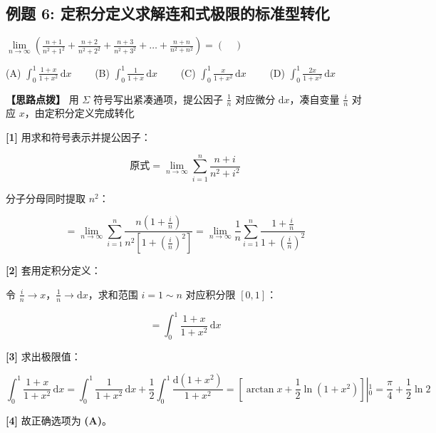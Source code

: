 \documentclass[11pt,a4paper,UTF8]{ctexart}
\begin{document}
\subsection{例题 6: 定积分定义求解连和式极限的标准型转化}

$\lim\limits_{n \to \infty} \left( \frac{n+1}{n^2+1^2} + \frac{n+2}{n^2+2^2} + \frac{n+3}{n^2+3^2} + \dots + \frac{n+n}{n^2+n^2} \right) = (\quad)$

(A) $\int_0^1 \frac{1+x}{1+x^2}\,\mathrm{d}x \qquad$ (B) $\int_0^1 \frac{1}{1+x}\,\mathrm{d}x \qquad$ (C) $\int_0^1 \frac{x}{1+x^2}\,\mathrm{d}x \qquad$ (D) $\int_0^1 \frac{2x}{1+x^2}\,\mathrm{d}x$

\textbf{\color{DeepPurple}【思路点拨】} 用 $\Sigma$ 符号写出紧凑通项，提公因子 $\frac{1}{n}$ 对应微分 $\mathrm{d}x$，凑自变量 $\frac{i}{n}$ 对应 $x$，由定积分定义完成转化


\begin{solbox}[分步推导与答题规范]
\textbf{[1]} 用求和符号表示并提公因子：


\begin{equation*}
\text{原式} = \lim_{n \to \infty} \sum_{i=1}^n \frac{n+i}{n^2+i^2}
\end{equation*}


分子分母同时提取 $n^2$：


\begin{equation*}
= \lim_{n \to \infty} \sum_{i=1}^n \frac{n\left(1 + \frac{i}{n}\right)}{n^2\left[1 + \left(\frac{i}{n}\right)^2\right]} = \lim_{n \to \infty} \frac{1}{n}\sum_{i=1}^n \frac{1 + \frac{i}{n}}{1 + \left(\frac{i}{n}\right)^2}
\end{equation*}


\textbf{[2]} 套用定积分定义：

令 $\frac{i}{n} \to x$，$\frac{1}{n} \to \mathrm{d}x$，求和范围 $i=1 \sim n$ 对应积分限 $[0, 1]$：


\begin{equation*}
= \int_0^1 \frac{1+x}{1+x^2}\,\mathrm{d}x
\end{equation*}


\textbf{[3]} 求出极限值：


\begin{equation*}
\int_0^1 \frac{1+x}{1+x^2}\,\mathrm{d}x = \int_0^1 \frac{1}{1+x^2}\,\mathrm{d}x + \frac{1}{2}\int_0^1 \frac{\mathrm{d}(1+x^2)}{1+x^2} = \left. \left[ \arctan x + \frac{1}{2}\ln(1+x^2) \right] \right\vert{}_0^1 = \frac{\pi}{4} + \frac{1}{2}\ln 2
\end{equation*}


\textbf{[4]} 故正确选项为 \textbf{(A)}。
\end{solbox}
\end{document}
